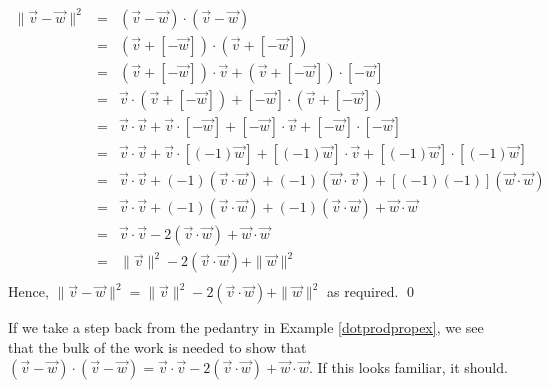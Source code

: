 \documentclass{ximera}
\begin{document}
\begin{example}
\begin{explanation}
\[\begin{array}{rcl}
\| \overrightarrow{v} - \overrightarrow{w} \|^2 & = & (\overrightarrow{v} - \overrightarrow{w}) \cdot (\overrightarrow{v} - \overrightarrow{w})  \\ 
& = & (\overrightarrow{v} + [-\overrightarrow{w}]) \cdot (\overrightarrow{v} + [-\overrightarrow{w}]) \\ 										
& = &  (\overrightarrow{v} + [-\overrightarrow{w}]) \cdot \overrightarrow{v}  +(\overrightarrow{v} + [-\overrightarrow{w}]) \cdot [-\overrightarrow{w}]  \\ 		
& = & \overrightarrow{v} \cdot (\overrightarrow{v} + [-\overrightarrow{w}])  + [-\overrightarrow{w}] \cdot (\overrightarrow{v} + [-\overrightarrow{w}]) \\ 
& = & \overrightarrow{v} \cdot \overrightarrow{v} + \overrightarrow{v} \cdot [-\overrightarrow{w}] + [-\overrightarrow{w}]\cdot \overrightarrow{v} + [-\overrightarrow{w}]\cdot[-\overrightarrow{w}] \\ 
& = & \overrightarrow{v} \cdot \overrightarrow{v} + \overrightarrow{v} \cdot [(-1)\overrightarrow{w}] + [(-1)\overrightarrow{w}]\cdot \overrightarrow{v} + [(-1)\overrightarrow{w}]\cdot[(-1)\overrightarrow{w}] \\ 	
& = & \overrightarrow{v} \cdot \overrightarrow{v} + (-1)(\overrightarrow{v} \cdot \overrightarrow{w}) + (-1)(\overrightarrow{w} \cdot \overrightarrow{v}) + [(-1)(-1)](\overrightarrow{w}\cdot\overrightarrow{w}) \\ 	
& = & \overrightarrow{v} \cdot \overrightarrow{v} + (-1)(\overrightarrow{v} \cdot \overrightarrow{w}) + (-1)(\overrightarrow{v} \cdot \overrightarrow{w}) + \overrightarrow{w}\cdot\overrightarrow{w} \\ 
& = & \overrightarrow{v} \cdot \overrightarrow{v} -2(\overrightarrow{v} \cdot \overrightarrow{w}) + \overrightarrow{w}\cdot\overrightarrow{w} \\ 
& = & \|\overrightarrow{v}\|^2-2(\overrightarrow{v} \cdot \overrightarrow{w}) + \|\overrightarrow{w}\|^2 \\ \end{array} \]
Hence,  $\| \overrightarrow{v} - \overrightarrow{w} \|^2 =  \|\overrightarrow{v}\|^2  -2 (\overrightarrow{v}\cdot\overrightarrow{w}) + \|\overrightarrow{w}\|^2$ as required.  \qed
\end{explanation}
\end{example} 

If we take a step back from the pedantry in Example \ref{dotprodpropex}, we see that the bulk of the work is needed to show that $(\overrightarrow{v} - \overrightarrow{w}) \cdot (\overrightarrow{v} - \overrightarrow{w})  = \overrightarrow{v} \cdot \overrightarrow{v} -2(\overrightarrow{v} \cdot \overrightarrow{w}) + \overrightarrow{w}\cdot\overrightarrow{w}$.  If this looks familiar, it should. 
\end{document}
